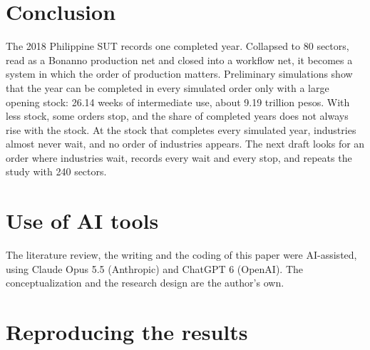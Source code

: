 \documentclass[11pt]{article}
\begin{document}
\section{Conclusion}\label{sec:conclusion}

The 2018 Philippine SUT records one completed year. Collapsed to 80 sectors, read as a Bonanno production net and closed into a workflow net, it becomes a system in which the order of production matters. Preliminary simulations show that the year can be completed in every simulated order only with a large opening stock: 26.14 weeks of intermediate use, about 9.19 trillion pesos. With less stock, some orders stop, and the share of completed years does not always rise with the stock. At the stock that completes every simulated year, industries almost never wait, and no order of industries appears. The next draft looks for an order where industries wait, records every wait and every stop, and repeats the study with 240 sectors.

\section*{Use of AI tools}

The literature review, the writing and the coding of this paper were AI-assisted, using Claude Opus 5.5 (Anthropic) and ChatGPT 6 (OpenAI). The conceptualization and the research design are the author's own.

\appendix

\section{Reproducing the results}\label{app:reproduce}
\end{document}

